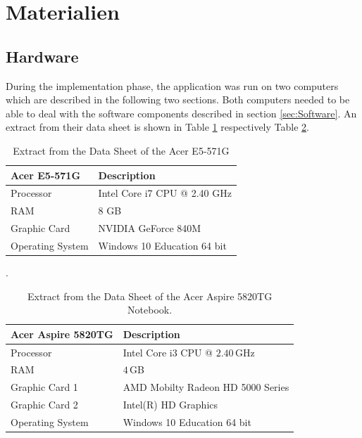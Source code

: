 
\section{Materialien}\label{sec:Materials}

\subsection{Hardware}\label{sec:Hardware}

During the implementation phase, the application was run on two computers which are described in the following two sections. Both computers needed to be able to deal with the software components described in section \ref{sec:Software}. An extract from their data sheet is shown in Table \ref{tab:Computer1} respectively Table \ref{tab:Computer2}.


\begin{table}[H]
	\centering
	\begin{tabular}{|l|l|}
		\hline
		\Absatzbox{}
		\textbf{Acer E5-571G}& \textbf{Description} \\
		\hline
		Processor & Intel Core i7 CPU @ 2.40 GHz\\
		\hline
		RAM & 8 GB  \\
		\hline 
		Graphic Card & NVIDIA GeForce 840M\\
		\hline
		Operating System &  Windows 10 Education 64 bit   \\
		\hline
	\end{tabular}
	\caption[Extract from the Data Sheet of the Acer E5-571G]{Extract from the Data Sheet of the Acer E5-571G}.
	\label{tab:Computer1}
\end{table}
\begin{table}[H]
	\centering
	\begin{tabular}{|l|l|}
		\hline
		\Absatzbox{}
		\textbf{Acer Aspire 5820TG}& \textbf{Description} \\
		\hline
		Processor & Intel Core i3 CPU @ $2.40\,$GHz \\
		\hline
		RAM & $4\,$GB \\
		\hline 
		Graphic Card 1 & AMD Mobilty Radeon HD 5000 Series\\
		\hline
		Graphic Card 2 & Intel(R) HD Graphics\\
		\hline
		Operating System & Windows 10 Education 64 bit \\
		\hline
	\end{tabular}
	\caption[Extract from the Data Sheet of the Acer Aspire 5820TG Notebook.]{Extract from the Data Sheet of the Acer Aspire 5820TG Notebook.}
	\label{tab:Computer2}
\end{table}

